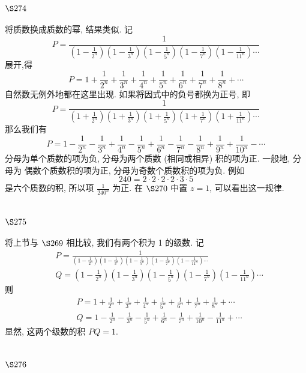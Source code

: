 \section{$\S 274$}

将质数换成质数的幂, 结果类似. 记
\[
P=\frac{1}{\left(1-\frac{1}{2^{n}}\right)\left(1-\frac{1}{3^{n}}\right)\left(1-\frac{1}{5^{n}}\right)\left(1-\frac{1}{7^{n}}\right)\left(1-\frac{1}{11^{n}}\right) \cdots}
\]
展开,得
\[
P=1+\frac{1}{2^{n}}+\frac{1}{3^{n}}+\frac{1}{4^{n}}+\frac{1}{5^{n}}+\frac{1}{6^{n}}+\frac{1}{7^{n}}+\frac{1}{8^{n}}+\cdots
\]
自然数无例外地都在这里出现. 如果将因式中的负号都换为正号, 即
\[
P=\frac{1}{\left(1+\frac{1}{2^{n}}\right)\left(1+\frac{1}{3^{n}}\right)\left(1+\frac{1}{5^{n}}\right)\left(1+\frac{1}{7^{n}}\right)\left(1+\frac{1}{11^{n}}\right) \cdots}
\]
那么我们有
\[
P=1-\frac{1}{2^{n}}-\frac{1}{3^{n}}+\frac{1}{4^{n}}-\frac{1}{5^{n}}+\frac{1}{6^{n}}-\frac{1}{7^{n}}-\frac{1}{8^{n}}+\frac{1}{9^{n}}+\frac{1}{10^{n}}-\cdots
\]
分母为单个质数的项为负, 分母为两个质数 (相同或相异) 积的项为正. 一般地, 分母为 偶数个质数积的项为正, 分母为奇数个质数积的项为负. 例如
\[
240=2 \cdot 2 \cdot 2 \cdot 2 \cdot 3 \cdot 5
\]
是六个质数的积, 所以项 $\frac{1}{240^{n}}$ 为正. 在 $\S 270$ 中置 $z=1$, 可以看出这一规律.

\section{$\S 275$}

将上节与 $\S 269$ 相比较, 我们有两个积为 1 的级数. 记 
\[
\begin{aligned}
& P=\frac{1}{\left(1-\frac{1}{2^{n}}\right)\left(1-\frac{1}{3^{n}}\right)\left(1-\frac{1}{5^{n}}\right)\left(1-\frac{1}{7^{n}}\right)\left(1-\frac{1}{11^{n}}\right) \cdots} \\
& Q=\left(1-\frac{1}{2^{n}}\right)\left(1-\frac{1}{3^{n}}\right)\left(1-\frac{1}{5^{n}}\right)\left(1-\frac{1}{7^{n}}\right)\left(1-\frac{1}{11^{n}}\right) \cdots
\end{aligned}
\]
则
\[
\begin{aligned}
& P=1+\frac{1}{2^{n}}+\frac{1}{3^{n}}+\frac{1}{4^{n}}+\frac{1}{5^{n}}+\frac{1}{6^{n}}+\frac{1}{7^{n}}+\frac{1}{8^{n}}+\cdots \\
& Q=1-\frac{1}{2^{n}}-\frac{1}{3^{n}}-\frac{1}{5^{n}}+\frac{1}{6^{n}}-\frac{1}{7^{n}}+\frac{1}{10^{n}}-\frac{1}{11^{n}}+\cdots
\end{aligned}
\]
显然, 这两个级数的积 $P Q=1$.

\section{$\S 276$}

